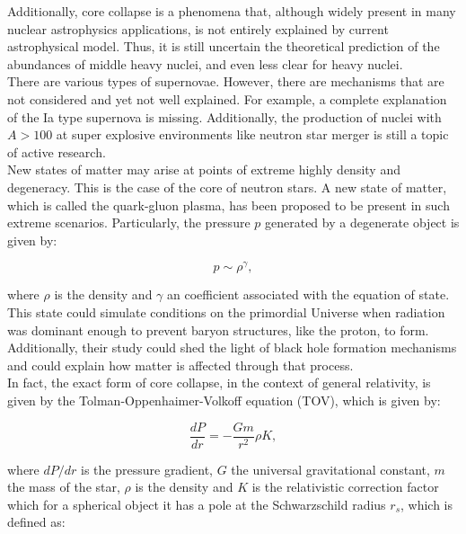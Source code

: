 \documentclass[openany]{book}
\begin{document}
Additionally, core collapse is a phenomena that, although widely present in many nuclear astrophysics applications, is not entirely explained by current astrophysical model. Thus, it is still uncertain the theoretical prediction of the abundances of middle heavy nuclei, and even less clear for heavy nuclei. \\ 

There are various types of supernovae. However, there are mechanisms that are not considered and yet not well explained. For example, a complete explanation of the Ia type supernova is missing. Additionally, the production of nuclei with $A > 100$ at super explosive environments like neutron star merger is still a topic of active research.  \\

New states of matter may arise at points of extreme highly density and degeneracy. This is the case of the core of neutron stars. A new state of matter, which is called the quark-gluon plasma, has been proposed to be present in such extreme scenarios. Particularly, the pressure $p$ generated  by a degenerate object is given by: 

\begin{equation}\label{eq:reaction_degenerate}
	p \sim \rho^{\gamma},
\end{equation} 

where $\rho$ is the density and $\gamma$ an coefficient associated with the equation of state.  \\

This state could simulate conditions on the primordial Universe when radiation was dominant enough to prevent baryon structures, like the proton, to form. Additionally, their study could shed the light of black hole formation mechanisms and could explain how matter is affected through that process. \\

In fact, the exact form of core collapse, in the context of general relativity, is given by the Tolman-Oppenhaimer-Volkoff equation (TOV), which is given by: 

\begin{equation}\label{eq:reaction_TOV}
	\frac{dP}{dr} = - \frac{Gm}{r^2} \rho  K,
\end{equation} 

where $dP/dr$ is the pressure gradient, $G$ the universal gravitational constant, $m$ the mass of the star, $\rho$ is the density and $K$ is the relativistic correction factor which for a spherical object it has a pole at the Schwarzschild radius $r_s$, which is defined as: 
\end{document}
